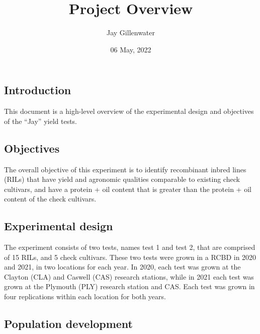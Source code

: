 \documentclass[
]{article}
\title{Project Overview}
\author{Jay Gillenwater}
\date{06 May, 2022}
\begin{document}
\maketitle

\hypertarget{introduction}{%
\subsection{Introduction}\label{introduction}}

This document is a high-level overview of the experimental design and
objectives of the ``Jay'' yield tests.

\hypertarget{objectives}{%
\subsection{Objectives}\label{objectives}}

The overall objective of this experiment is to identify recombinant
inbred lines (RILs) that have yield and agronomic qualities comparable
to existing check cultivars, and have a protein + oil content that is
greater than the protein + oil content of the check cultivars.

\hypertarget{experimental-design}{%
\subsection{Experimental design}\label{experimental-design}}

The experiment consists of two tests, names test 1 and test 2, that are
comprised of 15 RILs, and 5 check cultivars. These two tests were grown
in a RCBD in 2020 and 2021, in two locations for each year. In 2020,
each test was grown at the Clayton (CLA) and Caswell (CAS) research
stations, while in 2021 each test was grown at the Plymouth (PLY)
research station and CAS. Each test was grown in four replications
within each location for both years.

\hypertarget{population-development}{%
\subsection{Population development}\label{population-development}}
\end{document}
